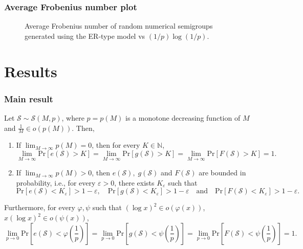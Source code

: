 \documentclass{beamer}
\def\N{\ensuremath{\mathbb{N}}}
\def\Pr{\ensuremath{\mathrm{Pr}}}
\begin{document}
    \begin{frame}
        \frametitle{Average Frobenius number plot}
        \begin{figure}
            \begin{center}
                \scalebox{0.6}{}
            \end{center}
            \caption{Average Frobenius number of random numerical semigroups generated using the ER-type model vs $(1/p)\log(1/p)$.}
            \label{fig:frobenius}
        \end{figure}
    \end{frame}


\section{Results}

\begin{frame}
    \frametitle{Main result}
    \fontsize{8pt}{7.2}\selectfont
    \begin{theorem}\label{thm:main}
        Let $\mathcal{S} \sim \mathcal{S}(M, p)$, where $p = p(M)$ is a monotone decreasing function of $M$ and $\frac{1}{M} \in o(p(M))$. Then, 
    \begin{enumerate}
        \item If $\lim_{M \to \infty} p(M) = 0$, then for every $K \in \N$,   
        \[\lim_{M \to \infty} \Pr[e(\mathcal{S}) > K] = \lim_{M \to \infty} \Pr[g(\mathcal{S}) > K] = \lim_{M \to \infty} \Pr[F(\mathcal{S}) > K] = 1.\]
        \item If $\lim_{M \to \infty} p(M) > 0$, then $e(\mathcal{S}), \; g(\mathcal{S})$ and $F(\mathcal{S})$ are bounded in probability, i.e., for every $\varepsilon > 0$, there exists $K_\varepsilon$ such that 
        \[ \Pr[e(\mathcal{S}) < K_\varepsilon] > 1 - \varepsilon, \quad  \Pr[g(\mathcal{S}) < K_\varepsilon] > 1- \varepsilon \quad \text{and} \quad \Pr[F(\mathcal{S}) < K_\varepsilon] > 1 - \varepsilon.\]
    \end{enumerate}
    Furthermore, for every $\varphi, \psi$ such that $(\log x)^2 \in o(\varphi(x))$, $x(\log x)^2 \in o(\psi(x))$,
    \[\lim_{p \to 0} \Pr\left[e(\mathcal{S}) < \varphi\left(\frac{1}{p}\right)\right] = \lim_{p \to 0} \Pr\left[g(\mathcal{S}) < \psi\left(\frac{1}{p}\right)\right]  = \lim_{p \to 0} \Pr\left[F(\mathcal{S}) < \psi\left(\frac{1}{p}\right)\right] = 1.\]
    \end{theorem}
\end{frame}
\end{document}
